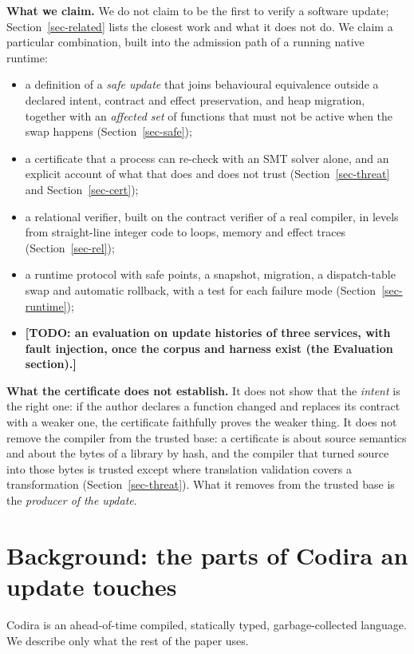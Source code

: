 \documentclass[10pt,twocolumn]{article}
\newcommand{\todo}[1]{{\color{red}\textbf{[TODO: #1]}}}
\begin{document}
\textbf{What we claim.} We do not claim to be the first to verify a software update; Section~\ref{sec-related} lists the closest work and what it does not do. We claim a particular combination, built into the admission path of a running native runtime:

\begin{itemize}
\item a definition of a \emph{safe update} that joins behavioural equivalence outside a declared intent, contract and effect preservation, and heap migration, together with an \emph{affected set} of functions that must not be active when the swap happens (Section~\ref{sec-safe});
\item a certificate that a process can re-check with an SMT solver alone, and an explicit account of what that does and does not trust (Section~\ref{sec-threat} and Section~\ref{sec-cert});
\item a relational verifier, built on the contract verifier of a real compiler, in levels from straight-line integer code to loops, memory and effect traces (Section~\ref{sec-rel});
\item a runtime protocol with safe points, a snapshot, migration, a dispatch-table swap and automatic rollback, with a test for each failure mode (Section~\ref{sec-runtime});
\item \todo{an evaluation on update histories of three services, with fault injection, once the corpus and harness exist (the Evaluation section).}
\end{itemize}
\textbf{What the certificate does not establish.} It does not show that the \emph{intent} is the right one: if the author declares a function changed and replaces its contract with a weaker one, the certificate faithfully proves the weaker thing. It does not remove the compiler from the trusted base: a certificate is about source semantics and about the bytes of a library by hash, and the compiler that turned source into those bytes is trusted except where translation validation covers a transformation (Section~\ref{sec-threat}). What it removes from the trusted base is the \emph{producer of the update}.

\section{Background: the parts of Codira an update touches}\label{sec-bg}
Codira is an ahead-of-time compiled, statically typed, garbage-collected language. We describe only what the rest of the paper uses.
\end{document}
